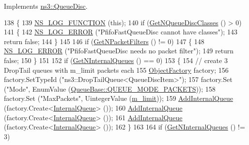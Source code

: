 Implements \hyperlink{classns3_1_1QueueDisc_ace6ef0c9afd0954c4629ad454bf975f5}{ns3\+::\+Queue\+Disc}.


\begin{DoxyCode}
138 \{
139   \hyperlink{log-macros-disabled_8h_a90b90d5bad1f39cb1b64923ea94c0761}{NS\_LOG\_FUNCTION} (\textcolor{keyword}{this});
140   \textcolor{keywordflow}{if} (\hyperlink{classns3_1_1QueueDisc_a8165c6afde992b073bc4d3bb283ed138}{GetNQueueDiscClasses} () > 0)
141     \{
142       \hyperlink{group__logging_ga0261a8db1d4ac5f79417d117634fd455}{NS\_LOG\_ERROR} (\textcolor{stringliteral}{"PfifoFastQueueDisc cannot have classes"});
143       \textcolor{keywordflow}{return} \textcolor{keyword}{false};
144     \}
145 
146   \textcolor{keywordflow}{if} (\hyperlink{classns3_1_1QueueDisc_aff24dd5be3fe3aa46b88c00659e09b23}{GetNPacketFilters} () != 0)
147     \{
148       \hyperlink{group__logging_ga0261a8db1d4ac5f79417d117634fd455}{NS\_LOG\_ERROR} (\textcolor{stringliteral}{"PfifoFastQueueDisc needs no packet filter"});
149       \textcolor{keywordflow}{return} \textcolor{keyword}{false};
150     \}
151 
152   \textcolor{keywordflow}{if} (\hyperlink{classns3_1_1QueueDisc_a98e658dc1b0b32104ffc9e07afd205c6}{GetNInternalQueues} () == 0)
153     \{
154       \textcolor{comment}{// create 3 DropTail queues with m\_limit packets each}
155       \hyperlink{classns3_1_1Object_a2810e70b8c8377aa8617138fc0f65e92}{ObjectFactory} factory;
156       factory.SetTypeId (\textcolor{stringliteral}{"ns3::DropTailQueue<QueueDiscItem>"});
157       factory.Set (\textcolor{stringliteral}{"Mode"}, EnumValue (\hyperlink{classns3_1_1QueueBase_adc473162c2a2bcb3d76d151d6d7ee02aa68a809be7a09a4c4c7d8feb37f2f7a9d}{QueueBase::QUEUE\_MODE\_PACKETS}));
158       factory.Set (\textcolor{stringliteral}{"MaxPackets"}, UintegerValue (\hyperlink{classns3_1_1PfifoFastQueueDisc_ac0c01461b2419ffafef7485e526c1990}{m\_limit}));
159       \hyperlink{classns3_1_1QueueDisc_a0599223e2a3976ef042a56c2923a2b61}{AddInternalQueue} (factory.Create<\hyperlink{classns3_1_1QueueDisc_a3acb7d460465f9f13c6fbbdeae7508f8}{InternalQueue}> ());
160       \hyperlink{classns3_1_1QueueDisc_a0599223e2a3976ef042a56c2923a2b61}{AddInternalQueue} (factory.Create<\hyperlink{classns3_1_1QueueDisc_a3acb7d460465f9f13c6fbbdeae7508f8}{InternalQueue}> ());
161       \hyperlink{classns3_1_1QueueDisc_a0599223e2a3976ef042a56c2923a2b61}{AddInternalQueue} (factory.Create<\hyperlink{classns3_1_1QueueDisc_a3acb7d460465f9f13c6fbbdeae7508f8}{InternalQueue}> ());
162     \}
163 
164   \textcolor{keywordflow}{if} (\hyperlink{classns3_1_1QueueDisc_a98e658dc1b0b32104ffc9e07afd205c6}{GetNInternalQueues} () != 3)

\end{DoxyCode}
